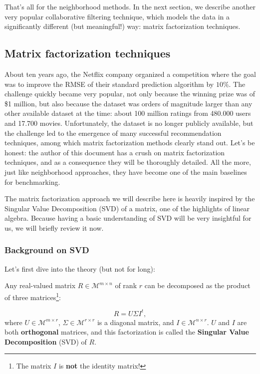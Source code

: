That's all for the neighborhood methods. In the next section, we describe
another very popular collaborative filtering technique, which models the data
in a significantly different (but meaningful!) way: matrix factorization
techniques.

\subsection{Matrix factorization techniques}
\label{SEC:matrix_facto}

About ten years ago, the Netflix company organized a competition where the goal
was to improve the RMSE of their standard prediction algorithm by $10\%$. The
challenge quickly became very popular, not only because the winning prize was
of \$1 million, but also because the dataset was orders of magnitude larger
than any other available dataset at the time: about 100 million ratings from
480.000 users and 17.700 movies. Unfortunately, the dataset is no longer
publicly available, but the challenge led to the emergence of many successful
recommendation techniques, among which matrix factorization methods clearly
stand out. Let's be honest: the author of this document has a crush on matrix
factorization techniques, and as a consequence they will be thoroughly
detailed. All the more, just like neighborhood approaches, they have become one
of the main baselines for benchmarking.

The matrix factorization approach we will describe here is heavily inspired by
the Singular Value Decomposition (SVD) of a matrix, one of the highlights of
linear algebra. Because having a basic understanding of SVD will be very
insightful for us, we will briefly review it now.

\subsubsection{Background on SVD}

Let's first dive into the theory (but not for long):

\begin{proposition}
  Any real-valued matrix $R \in \mathcal{M}^{m \times n}$ of rank $r$ can be
  decomposed as the product of three matrices\footnote{The matrix $I$ is
  \textbf{not} the identity matrix!}:

  $$R = U\Sigma I^t,$$
  where $U\in \mathcal{M}^{m \times r}$, $\Sigma\in \mathcal{M}^{r \times r}$
  is a diagonal matrix, and $I\in \mathcal{M}^{n \times r}$. $U$ and $I$ are
  both \textbf{orthogonal} matrices, and this factorization is called the \textbf{Singular Value
  Decomposition} (SVD) of $R$.
\end{proposition}

